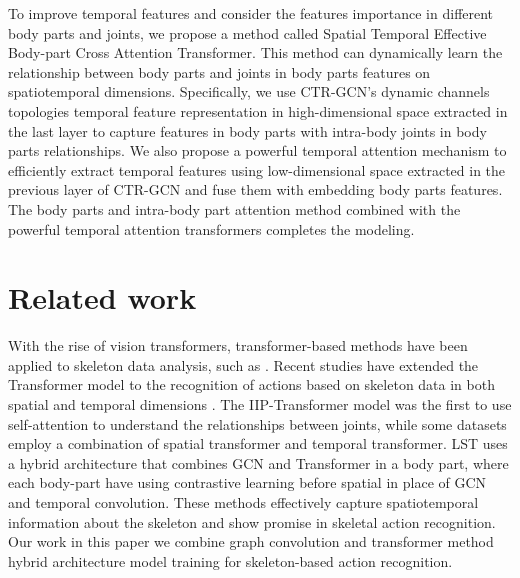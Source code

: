 \documentclass{bmvc2k}
\begin{document}
To improve temporal features and consider the features importance in different body parts and joints, we propose a method called Spatial Temporal Effective Body-part Cross Attention Transformer. This method can dynamically learn the relationship between body parts and joints in body parts features on spatiotemporal dimensions. Specifically, we use CTR-GCN's dynamic channels topologies temporal feature representation in high-dimensional space extracted in the last layer to capture features in body parts with intra-body joints in body parts relationships. We also propose a powerful temporal attention mechanism to efficiently extract temporal features using low-dimensional space extracted in the previous layer of CTR-GCN and fuse them with embedding body parts features. The body parts and intra-body part attention method combined with the powerful temporal attention transformers completes the modeling.








\section{Related work}







With the rise of vision transformers, transformer-based methods have been applied to skeleton data analysis, such as \cite{Plizzari2020-lc,Shi2020-uk,Wang2021-ua,Kim2022-pu,Gao2022-pd,Wangmeng-2022}. Recent studies have extended the Transformer model to the recognition of actions based on skeleton data in both spatial and temporal dimensions \cite{Plizzari2020-lc,Shi2020-uk,Wang2021-ua}. The IIP-Transformer model \cite{Wang2021-ua} was the first to use self-attention to understand the relationships between joints, while some datasets employ a combination of spatial transformer and temporal transformer. LST \cite{Wangmeng-2022} uses a hybrid architecture that combines GCN and Transformer in a body part, where each body-part have using contrastive learning before spatial in place of GCN and temporal convolution. These methods effectively capture spatiotemporal information about the skeleton and show promise in skeletal action recognition. Our work in this paper we combine graph convolution and transformer method hybrid architecture model training for skeleton-based action recognition.
\end{document}
